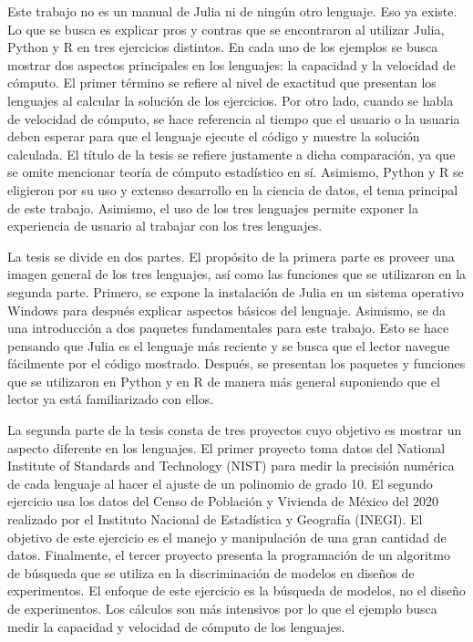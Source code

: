 Este trabajo no es un manual de \textsf{Julia} ni de ningún otro lenguaje. Eso ya existe. Lo que se busca es explicar pros y contras que se encontraron al utilizar \textsf{Julia}, \textsf{Python} y \textsf{R} en tres ejercicios distintos. En cada uno de los ejemplos se busca mostrar dos aspectos principales en los lenguajes: la capacidad y la velocidad de cómputo. El primer término se refiere al nivel de exactitud que presentan los lenguajes al calcular la solución de los ejercicios. Por otro lado, cuando se habla de velocidad de cómputo, se hace referencia al tiempo que el usuario o la usuaria deben esperar para que el lenguaje ejecute el código y muestre la solución calculada. El título de la tesis se refiere justamente a dicha comparación, ya que se omite mencionar teoría de cómputo estadístico en sí. Asimismo, \textsf{Python} y \textsf{R} se eligieron por su uso y extenso desarrollo en la ciencia de datos, el tema principal de este trabajo. Asimismo, el uso de los tres lenguajes permite exponer la experiencia de usuario al trabajar con los tres lenguajes. 

La tesis se divide en dos partes. El propósito de la primera parte es proveer una imagen general de los tres lenguajes, así como las funciones que se utilizaron en la segunda parte. Primero, se expone la instalación de \textsf{Julia} en un sistema operativo \textsf{Windows} para después explicar aspectos básicos del lenguaje. Asimismo, se da una introducción a dos paquetes fundamentales para este trabajo. Esto se hace pensando que \textsf{Julia} es el lenguaje más reciente y se busca que el lector navegue fácilmente por el código mostrado. Después, se presentan los paquetes y funciones que se utilizaron en \textsf{Python} y en \textsf{R} de manera más general suponiendo que el lector ya está familiarizado con ellos. 

La segunda parte de la tesis consta de tres proyectos cuyo objetivo es mostrar un aspecto diferente en los lenguajes. El primer proyecto toma datos del National Institute of Standards and Technology (NIST) para medir la precisión numérica de cada lenguaje al hacer el ajuste de un polinomio de grado 10. El segundo ejercicio usa los datos del Censo de Población y Vivienda de México del 2020 realizado por el Instituto Nacional de Estadística y Geografía (INEGI). El objetivo de este ejercicio es el manejo y manipulación de una gran cantidad de datos. Finalmente, el tercer proyecto presenta la programación de un algoritmo de búsqueda que se utiliza en la discriminación de modelos en diseños de experimentos. El enfoque de este ejercicio es la búsqueda de modelos, no el diseño de experimentos. Los cálculos son más intensivos por lo que el ejemplo busca medir la capacidad y velocidad de cómputo de los lenguajes. 

